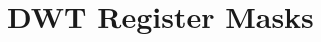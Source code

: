 \hypertarget{group___d_w_t___register___masks}{}\section{D\+W\+T Register Masks}
\label{group___d_w_t___register___masks}
